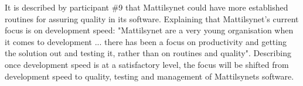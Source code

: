 

It is described by participant \#9 that Mattilsynet could have more established routines for assuring quality in its software. Explaining that Mattilsynet's current focus is on development speed: "Mattilsynet are a very young organisation when it comes to development ... there has been a focus on productivity and getting the solution out and testing it, rather than on routines and quality". Describing once development speed is at a satisfactory level, the focus will be shifted from development speed to quality, testing and management of Mattilsynets software.






